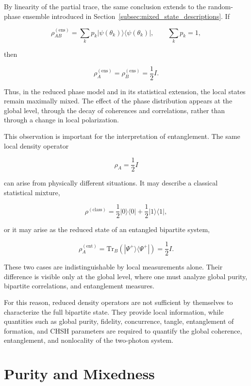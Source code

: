 \medskip

By linearity of the partial trace, the same conclusion extends to the random-phase ensemble introduced in Section~\ref{subsec:mixed_state_descriptions}. If

\[
\rho_{AB}^{(\mathrm{ens})}
=
\sum_k p_k
|\psi(\theta_k)\rangle
\langle \psi(\theta_k)|,
\qquad
\sum_k p_k = 1,
\]

then

\[
\rho_A^{(\mathrm{ens})}
=
\rho_B^{(\mathrm{ens})}
=
\frac{1}{2}I.
\]

Thus, in the reduced phase model and in its statistical extension, the local states remain maximally mixed. The effect of the phase distribution appears at the global level, through the decay of coherences and correlations, rather than through a change in local polarization.

\medskip

This observation is important for the interpretation of entanglement. The same local density operator

\[
\rho_A
=
\frac{1}{2}I
\]

can arise from physically different situations. It may describe a classical statistical mixture,

\[
\rho^{(\mathrm{class})}
=
\frac{1}{2}
|0\rangle\langle 0|
+
\frac{1}{2}
|1\rangle\langle 1|,
\]

or it may arise as the reduced state of an entangled bipartite system,

\[
\rho_A^{(\mathrm{ent})}
=
\mathrm{Tr}_B
\left(
|\Psi^+\rangle\langle\Psi^+|
\right)
=
\frac{1}{2}I.
\]

These two cases are indistinguishable by local measurements alone. Their difference is visible only at the global level, where one must analyze global purity, bipartite correlations, and entanglement measures.

\medskip

For this reason, reduced density operators are not sufficient by themselves to characterize the full bipartite state. They provide local information, while quantities such as global purity, fidelity, concurrence, tangle, entanglement of formation, and CHSH parameters are required to quantify the global coherence, entanglement, and nonlocality of the two-photon system.


\section{Purity and Mixedness}

